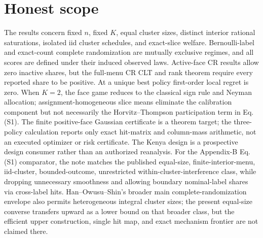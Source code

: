\documentclass{article}
\begin{document}
\section{Honest scope}

The results concern fixed \(n\), fixed \(K\), equal cluster sizes, distinct interior rational saturations, isolated iid cluster schedules, and exact-slice welfare. Bernoulli-label and exact-count complete randomization are mutually exclusive regimes, and all scores are defined under their induced observed laws. Active-face CR results allow zero inactive shares, but the full-menu CR CLT and rank theorem require every reported share to be positive. At a unique best policy first-order local regret is zero. When \(K=2\), the face game reduces to the classical sign rule and Neyman allocation; assignment-homogeneous slice means eliminate the calibration component but not necessarily the Horvitz--Thompson participation term in Eq. (S1). The finite positive-face Gaussian certificate is a theorem target; the three-policy calculation reports only exact hit-matrix and column-mass arithmetic, not an executed optimizer or risk certificate. The Kenya design is a prospective design consumer rather than an authorized reanalysis. For the Appendix-B Eq. (S1) comparator, the note matches the published equal-size, finite-interior-menu, iid-cluster, bounded-outcome, unrestricted within-cluster-interference class, while dropping unnecessary smoothness and allowing boundary nominal-label shares via cross-label hits. Han–Owusu–Shin’s broader main complete-randomization envelope also permits heterogeneous integral cluster sizes; the present equal-size converse transfers upward as a lower bound on that broader class, but the efficient upper construction, single hit map, and exact mechanism frontier are not claimed there.
\end{document}
